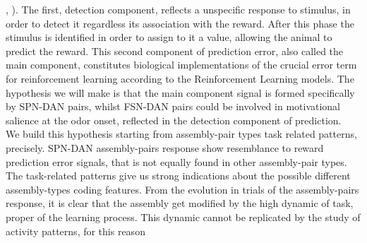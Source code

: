 \cite{Fiorillo2013b}, \cite{Schultz2016}). The first, detection component, reflects a unspecific response to stimulus, in order to detect it regardless its association with the reward. After this phase the stimulus is identified in order to assign to it a value, allowing the animal to predict the reward. This second component of prediction error, also called the main component, constitutes biological implementations of the crucial error term for reinforcement learning according to the Reinforcement Learning models. The hypothesis we will make is that the main component signal is formed specifically by SPN-DAN pairs, whilst FSN-DAN pairs could be involved in motivational salience at the odor onset, reflected in the detection component of prediction.\\We build this hypothesis starting from assembly-pair types task related patterns, precisely. SPN-DAN assembly-pairs response show resemblance to reward prediction error signals, that is not equally found in other assembly-pair types.\\The task-related patterns give us strong indications about the possible different assembly-types coding features. From the evolution in trials of the assembly-pairs response, it is clear that the assembly get modified by the high dynamic of task, proper of the learning process. This dynamic cannot be replicated by the study of activity patterns, for this reason 